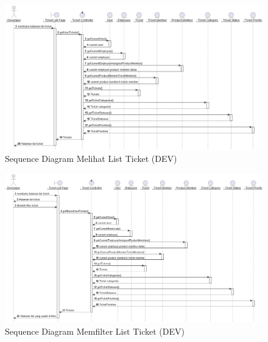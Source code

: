 \documentclass[12pt]{article}
\begin{document}
\begin{enumerate}[label=\textbf{4.\arabic*.}]
\begin{enumerate} [label=\textbf{4.2.\arabic*.}, wide, labelwidth=!, labelindent=0pt]
\begin{enumerate}[label=\textbf{4.2.2.\arabic*.}, wide, labelwidth=!, labelindent=0pt]
\begin{enumerate}[label=\arabic*.]
\begin{tabularx}{.9\linewidth}{@{} l l X @{}}
                \end{tabularx}


                
                
                \begin{figure}
                    \centering \includegraphics[width=\textwidth]{out/plantuml/sequence/idev/idev1/Melihat List Ticket.png}
                    \caption{Sequence Diagram Melihat List Ticket (DEV)}
                    \label{fig:SQ-DEV-01}
                \end{figure}

                \begin{figure}
                    \centering \includegraphics[width=\textwidth]{out/plantuml/sequence/idev/idev2/Memfilter List Ticket.png}
                    \caption{Sequence Diagram Memfilter List Ticket (DEV)}
                    \label{fig:SQ-DEV-02}
                \end{figure}


\end{enumerate}
\end{enumerate}
\end{enumerate}
\end{enumerate}
\end{document}
